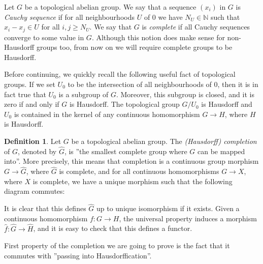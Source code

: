 \documentclass[12pt,a4paper,leqno]{article}
\newcommand{\N}{\mathbb{N}}
\theoremstyle{plain}
\theoremstyle{definition}
\newtheorem{defn}[theo]{Definition}
\theoremstyle{remark}
\begin{document}
Let $G$ be a topological abelian group. We say that a sequence $(x_i)$ in $G$ is \emph{Cauchy sequence} if for all neighbourhoods $U$ of $0$ we have $N_U \in \N$ such that $x_i - x_j \in U$ for all $i,j \geq N_U$. We say that $G$ is \emph{complete} if all Cauchy sequences converge to some value in $G$. Although this notion does make sense for non-Hausdorff groups too, from now on we will require complete groups to be Hausdorff.

Before continuing, we quickly recall the following useful fact of topological groups. If we set $U_0$ to be the intersection of all neighbourhoods of 0, then it is in fact true that $U_0$ is a subgroup of $G$. Moreover, this subgroup is closed, and it is zero if and only if $G$ is Hausdorff. The topological group $G / U_0$ is Hausdorff and $U_0$ is contained in the kernel of any continuous homomorphism $G \to H$, where $H$ is Hausdorff.

\begin{defn}
Let $G$ be a topological abelian group. The \emph{(Hausdorff) completion} of $G$, denoted by $\widehat G$, is ''the smallest complete group where $G$ can be mapped into''. More precisely, this means that completion is a continuous group morphism $G \to \widehat G$, where $\widehat G$ is complete, and for all continuous homomorphisms $G \to X$, where $X$ is complete, we have a unique morphism such that the following diagram commutes:

\begin{center}
\end{center}
It is clear that this defines $\widehat G$ up to unique isomorphism if it exists. Given a continuous homomorphism $f: G \to H$, the universal property induces a morphism $\widehat f : \widehat G \to \widehat H$, and it is easy to check that this defines a functor.
\end{defn}

First property of the completion we are going to prove is the fact that it commutes with ''passing into Hausdorffication''.
\end{document}
